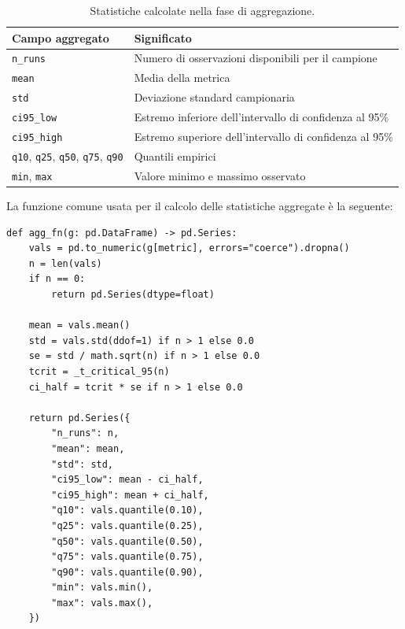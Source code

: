 \begin{table}[H]
  \centering
  \begin{tabular}{ll}
    \hline
    \textbf{Campo aggregato} & \textbf{Significato} \\
    \hline
    \texttt{n\_runs} & Numero di osservazioni disponibili per il campione \\
    \texttt{mean} & Media della metrica \\
    \texttt{std} & Deviazione standard campionaria \\
    \texttt{ci95\_low} & Estremo inferiore dell'intervallo di confidenza al 95\% \\
    \texttt{ci95\_high} & Estremo superiore dell'intervallo di confidenza al 95\% \\
    \texttt{q10}, \texttt{q25}, \texttt{q50}, \texttt{q75}, \texttt{q90} & Quantili empirici \\
    \texttt{min}, \texttt{max} & Valore minimo e massimo osservato \\
    \hline
  \end{tabular}
  \caption{Statistiche calcolate nella fase di aggregazione.}
  \label{tab:pipeline-statistiche-aggregate}
\end{table}

La funzione comune usata per il calcolo delle statistiche aggregate è la seguente:

\begin{listing}[H]
\begin{verbatim}
def agg_fn(g: pd.DataFrame) -> pd.Series:
    vals = pd.to_numeric(g[metric], errors="coerce").dropna()
    n = len(vals)
    if n == 0:
        return pd.Series(dtype=float)

    mean = vals.mean()
    std = vals.std(ddof=1) if n > 1 else 0.0
    se = std / math.sqrt(n) if n > 1 else 0.0
    tcrit = _t_critical_95(n)
    ci_half = tcrit * se if n > 1 else 0.0

    return pd.Series({
        "n_runs": n,
        "mean": mean,
        "std": std,
        "ci95_low": mean - ci_half,
        "ci95_high": mean + ci_half,
        "q10": vals.quantile(0.10),
        "q25": vals.quantile(0.25),
        "q50": vals.quantile(0.50),
        "q75": vals.quantile(0.75),
        "q90": vals.quantile(0.90),
        "min": vals.min(),
        "max": vals.max(),
    })
\end{verbatim}
\caption{Calcolo delle statistiche aggregate applicato alle metriche dei tre protocolli.}
\label{lst:pipeline-aggregate-stats-code}
\end{listing}

